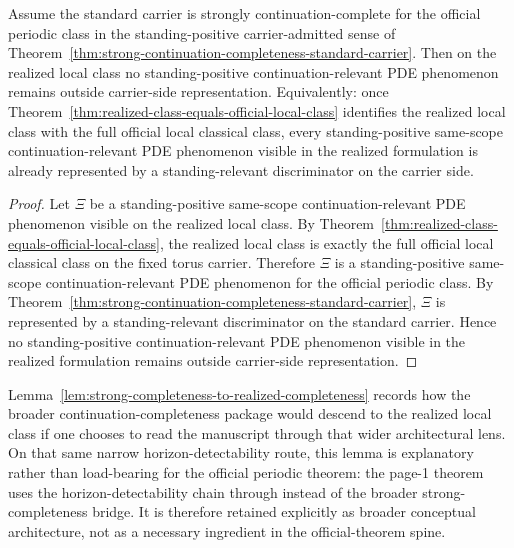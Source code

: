 \begin{lemma}\label{lem:strong-completeness-to-realized-completeness}
Assume the standard carrier is strongly continuation-complete for the official periodic class in the standing-positive carrier-admitted sense of Theorem~\ref{thm:strong-continuation-completeness-standard-carrier}. Then on the realized local class no standing-positive continuation-relevant PDE phenomenon remains outside carrier-side representation. Equivalently: once Theorem~\ref{thm:realized-class-equals-official-local-class} identifies the realized local class with the full official local classical class, every standing-positive same-scope continuation-relevant PDE phenomenon visible in the realized formulation is already represented by a standing-relevant discriminator on the carrier side.
\end{lemma}

\begin{proof}
Let $\Xi$ be a standing-positive same-scope continuation-relevant PDE phenomenon visible on the realized local class. By Theorem~\ref{thm:realized-class-equals-official-local-class}, the realized local class is exactly the full official local classical class on the fixed torus carrier. Therefore $\Xi$ is a standing-positive same-scope continuation-relevant PDE phenomenon for the official periodic class. By Theorem~\ref{thm:strong-continuation-completeness-standard-carrier}, $\Xi$ is represented by a standing-relevant discriminator on the standard carrier. Hence no standing-positive continuation-relevant PDE phenomenon visible in the realized formulation remains outside carrier-side representation.
\end{proof}

\begin{remark}
Lemma~\ref{lem:strong-completeness-to-realized-completeness} records how the broader continuation-completeness package would descend to the realized local class if one chooses to read the manuscript through that wider architectural lens. On that same narrow horizon-detectability route, this lemma is explanatory rather than load-bearing for the official periodic theorem: the page-1 theorem uses the horizon-detectability chain through \HorizonDetectabilityRef{} instead of the broader strong-completeness bridge. It is therefore retained explicitly as broader conceptual architecture, not as a necessary ingredient in the official-theorem spine.
\end{remark}

